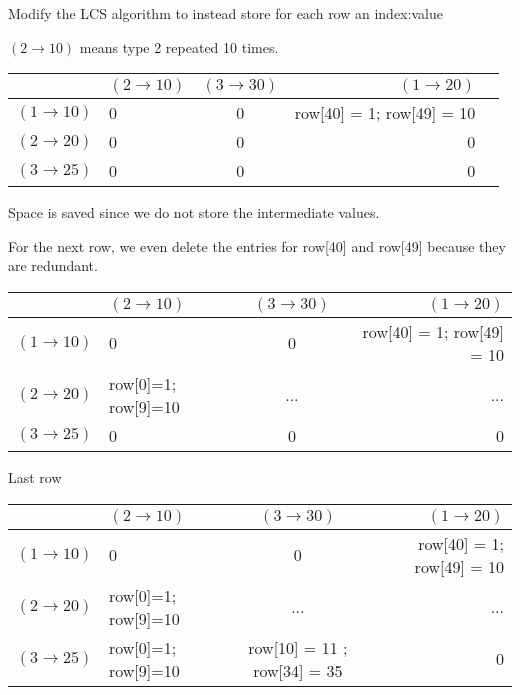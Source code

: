 \documentclass{article}
\begin{document}
\noindent
Modify the LCS algorithm to instead store for each row an index:value 

$(2 \rightarrow 10)$ means type 2 repeated 10 times.\vspace{5mm}

\noindent
\begin{flushleft}
\begin{tabular}{ l || l | c | r | p{3cm} }
\hline
  & $(2 \rightarrow 10)$ & $(3 \rightarrow 30)$ & $(1 \rightarrow 20)$ \\
\hline
 $(1 \rightarrow 10)$ &   0 & 0 & row[40] = 1; row[49] = 10 \\
 $(2 \rightarrow 20)$ &   0 & 0 & 0 \\
 $(3 \rightarrow 25)$ &   0 & 0 & 0 \\
\end{tabular}
\end{flushleft}
\vspace{5mm}Space is saved since we do not store the intermediate values.
\newline 

For the next row, we even delete the entries for row[40] and row[49] because they are redundant.
\vspace{5mm}

\begin{tabular}{ l || l | c | r }
\hline
  & $(2 \rightarrow 10)$ & $(3 \rightarrow 30)$ & $(1 \rightarrow 20)$ \\
\hline
 $(1 \rightarrow 10)$ &   0 & 0 & row[40] = 1; row[49] = 10 \\
 $(2 \rightarrow 20)$ &   row[0]=1; row[9]=10 & ... & ... \\
 $(3 \rightarrow 25)$ &   0 & 0 & 0 \\
\end{tabular}

\vspace{5mm}
Last row
\vspace{5mm}

\begin{tabular}{ l || l | c | r }
\hline
  & $(2 \rightarrow 10)$ & $(3 \rightarrow 30)$ & $(1 \rightarrow 20)$ \\
\hline
 $(1 \rightarrow 10)$ &   0 & 0 & row[40] = 1; row[49] = 10 \\
 $(2 \rightarrow 20)$ &   row[0]=1; row[9]=10 & ... & ... \\
 $(3 \rightarrow 25)$ &   row[0]=1; row[9]=10 & row[10] = 11 ; row[34] = 35 & 0 \\
\end{tabular}
\end{document}
